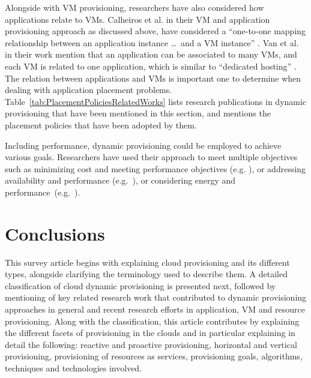 \documentclass[10pt,journal,cspaper,compsoc]{IEEEtran}
\begin{document}
Alongside with VM provisioning, researchers have also considered how applications relate to VMs. Calheiros et al. \cite{calheirosvirtual3} in their VM and application provisioning approach as discussed above, have considered a ``one-to-one mapping relationship between an application instance \ldots\ and a VM instance'' \cite{calheirosvirtual3}. Van et al. \cite{2009_AutoVMManagement_NguyenVan} in their work mention that an application can be associated to many VMs, and each VM is related to one application, which is similar to ``dedicated hosting'' \cite{urgaonkar2008agile10}. The relation between applications and VMs is important one to determine when dealing with application placement problems. Table~\ref{tab:PlacementPoliciesRelatedWorks} lists research publications in dynamic provisioning that have been mentioned in this section, and mentions the placement policies that have been adopted by them.

Including performance, dynamic provisioning could be employed to achieve various goals. Researchers have used their approach to meet multiple objectives such as minimizing cost and meeting performance objectives (e.g. \cite{jimliwoodside2009performance5, 2009_AutoVMManagement_NguyenVan, 2012_VerticalScaling}), or addressing availability and performance (e.g.~\cite{2010_Jung_PerfAvailability}), or considering energy and performance~(e.g.~\cite{2012_Anton_EnergyAware}).

\section{Conclusions}
\label{sec:Conclusions}
This survey article begins with explaining cloud provisioning and its different types, alongside clarifying the terminology used to describe them. A detailed classification of cloud dynamic provisioning is presented next, followed by mentioning of key related research work that contributed to dynamic provisioning approaches in general and recent research efforts in application, VM and resource provisioning. Along with the classification, this article contributes by explaining the different facets of provisioning in the clouds and in particular explaining in detail the following: reactive and proactive provisioning, horizontal and vertical provisioning, provisioning of resources as services, provisioning goals, algorithms, techniques and technologies involved.
\end{document}

